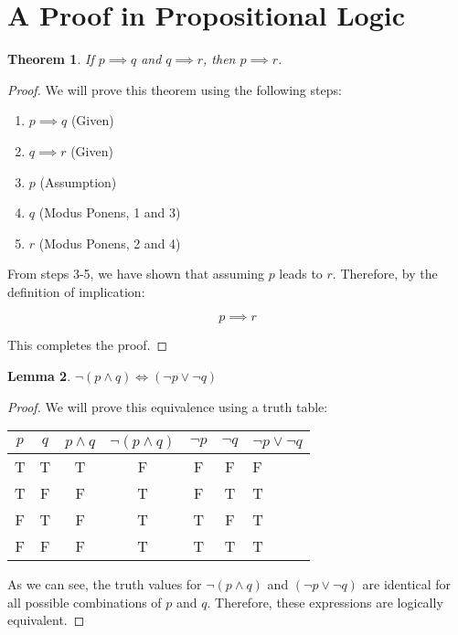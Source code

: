 \documentclass{article}
\newtheorem{theorem}{Theorem}
\newtheorem{lemma}[theorem]{Lemma}
\begin{document}
\section{A Proof in Propositional Logic}

\begin{theorem}
If $p \implies q$ and $q \implies r$, then $p \implies r$.
\end{theorem}

\begin{proof}
We will prove this theorem using the following steps:

\begin{enumerate}
    \item $p \implies q$ (Given)
    \item $q \implies r$ (Given)
    \item $p$ (Assumption)
    \item $q$ (Modus Ponens, 1 and 3)
    \item $r$ (Modus Ponens, 2 and 4)
\end{enumerate}

From steps 3-5, we have shown that assuming $p$ leads to $r$. Therefore, by the definition of implication:

\[
p \implies r
\]

This completes the proof.
\end{proof}

\begin{lemma}
$\neg(p \land q) \iff (\neg p \lor \neg q)$
\end{lemma}

\begin{proof}
We will prove this equivalence using a truth table:

\begin{center}
\begin{tabular}{|c|c|c|c|c|c|}
\hline
$p$ & $q$ & $p \land q$ & $\neg(p \land q)$ & $\neg p$ & $\neg q$ & $\neg p \lor \neg q$ \\
\hline
T & T & T & F & F & F & F \\
T & F & F & T & F & T & T \\
F & T & F & T & T & F & T \\
F & F & F & T & T & T & T \\
\hline
\end{tabular}
\end{center}

As we can see, the truth values for $\neg(p \land q)$ and $(\neg p \lor \neg q)$ are identical for all possible combinations of $p$ and $q$. Therefore, these expressions are logically equivalent.
\end{proof}
\end{document}
